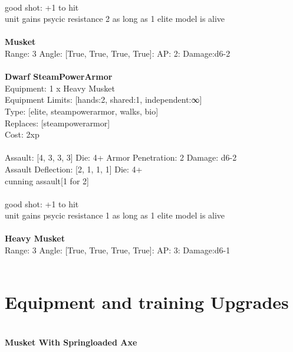 \ \\
good shot: +1 to hit\\ 
unit gains psycic resistance 2 as long as 1 elite model is alive\\ 

\ \\
{\bf Musket } \\



Range: 3  Angle: [True, True, True, True]: AP: 2: Damage:d6-2 \\




 
\ \\

{\bf Dwarf SteamPowerArmor } \\
Equipment: 1 x Heavy Musket \\
Equipment Limits: [hands:2, shared:1, independent:∞] \\
Type: [elite, steampowerarmor, walks, bio] \\
Replaces: [steampowerarmor] \\
Cost: 2xp\\
\ \\
Assault: [4, 3, 3, 3] Die: 4+ Armor Penetration: 2 Damage: d6-2 \\
Assault Deflection: [2, 1, 1, 1] Die: 4+\\
\indent cunning assault[1 for 2]\\ 
 
\ \\
good shot: +1 to hit\\ 
unit gains psycic resistance 1 as long as 1 elite model is alive\\ 

\ \\
{\bf Heavy Musket } \\



Range: 3  Angle: [True, True, True, True]: AP: 3: Damage:d6-1 \\




 
\ \\

\section{Equipment and training Upgrades}\ \\
{\bf Musket With Springloaded Axe } \\

